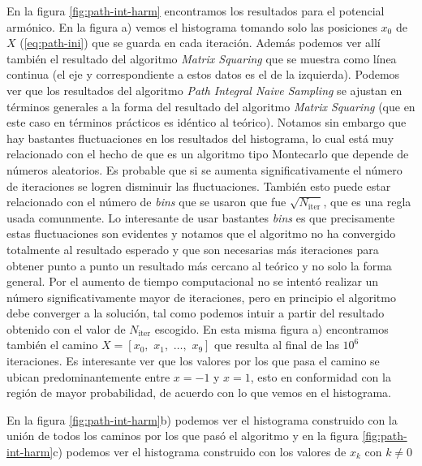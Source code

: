 \documentclass[%
 reprint,
 amsmath,amssymb,
 aps,
 pra,
]{revtex4-2}
\begin{document}
En la figura \ref{fig:path-int-harm} encontramos los resultados para el potencial armónico. En la figura a) vemos el histograma tomando solo las posiciones $x_0$ de  $X$ (\ref{eq:path-ini}) que se guarda en cada iteración. Además podemos ver allí también el resultado del algoritmo \textit{Matrix Squaring} que se muestra como línea continua (el eje y correspondiente a estos datos es el de la izquierda). Podemos ver que los resultados del algoritmo \textit{Path Integral Naive Sampling} se ajustan en términos generales a la forma del resultado del algoritmo \textit{Matrix Squaring} (que en este caso en términos prácticos es idéntico al teórico). Notamos sin embargo que hay bastantes fluctuaciones en los resultados del histograma, lo cual está muy relacionado con el hecho de que es un algoritmo tipo Montecarlo que depende de números aleatorios. Es probable que si se aumenta significativamente el número de iteraciones se logren disminuir las fluctuaciones. También esto puede estar relacionado con el número de \textit{bins} que se usaron que fue $\sqrt{N_\mathrm{iter}}$, que es una regla usada comunmente. Lo interesante de usar bastantes \textit{bins} es que precisamente estas fluctuaciones son evidentes y notamos que el algoritmo no ha convergido totalmente al resultado esperado y que son necesarias más iteraciones para obtener punto a punto un resultado más cercano al teórico y no solo la forma general. Por el aumento de tiempo computacional no se intentó realizar un número significativamente mayor de iteraciones, pero en principio el algoritmo debe converger a la solución, tal como podemos intuir a partir del resultado obtenido con el valor de $N_\mathrm{iter}$ escogido. En esta misma figura a) encontramos también el camino $X=[x_0,\,\,x_1,\,\,\dots,\,\,x_{9}]$ que resulta al final de las $10^6$ iteraciones. Es interesante ver que los valores por los que pasa el camino se ubican predominantemente entre $x=-1$ y $x=1$, esto en conformidad con la región de mayor probabilidad, de acuerdo con lo que vemos en el histograma.

En la figura \ref{fig:path-int-harm}b) podemos ver el histograma construido con la unión de todos los caminos por los que pasó el algoritmo y en  la figura \ref{fig:path-int-harm}c) podemos ver el histograma construido con los valores de $x_k$ con $k \neq 0$


\begin{figure*}[!ht]
	\centering
	\texttt{[image: \{\{figures/pi\_x-pi-plots-harmonic\_potential-beta\_4.000-N\_path\_10-N\_iter\_1000000-delta\_0.500-append\_every\_1-x\_max\_3.000]}}}
	\caption{\hl{caption}}
	\label{fig:path-int-harm}
\end{figure*}
\end{document}
